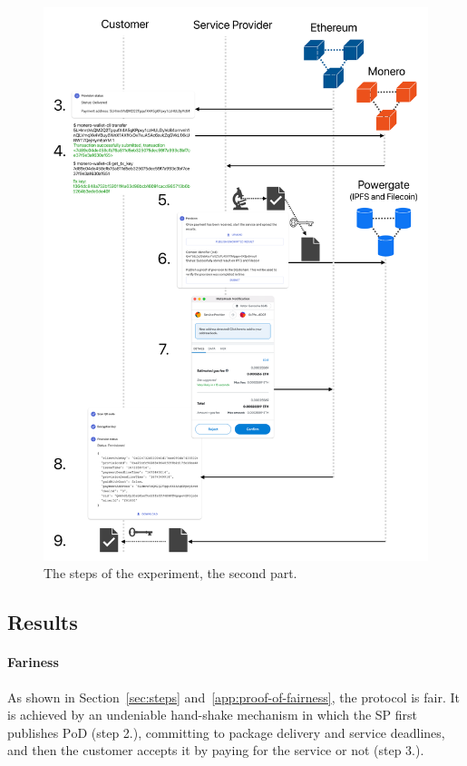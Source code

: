 \documentclass[pdftex,twocolumn,epjc3]{svjour3}
\begin{document}
{\begin{figure}
  \includegraphics[height=0.95\textheight,keepaspectratio]{anonser-experiment2.pdf}
  \caption{The steps of the experiment, the second part.}\label{fig:anonser-experiment2}
\end{figure}

\fi
\subsection{Results}

\paragraph{Fariness}
As shown in Section~\ref{sec:steps} and~\ref{app:proof-of-fairness}, 
the protocol is fair. It is achieved by an undeniable hand-shake mechanism in which the SP first publishes $\mathrm{PoD}$ (step 2.), committing to package delivery and service deadlines, and then the customer accepts it by paying for the service or not (step 3.).

}
\end{document}
